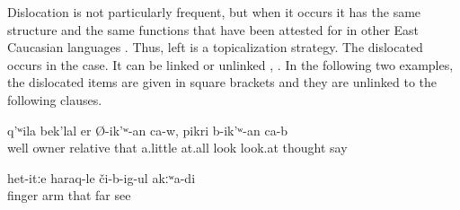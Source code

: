 Dislocation is not particularly frequent, but when it occurs it has the same structure and the same functions that have been attested for  in other East Caucasian languages \citep{Forker.Belyaev2016}. Thus, left  is a topicalization strategy. The dislocated  occurs in the  case. It can be linked or unlinked , . In the following two examples, the dislocated items are given in square brackets and they are unlinked to the following clauses.
%
\begin{exe}
	\ex	\label{ex:Well, also those own relatives, and those who do not have (relatives), one has to look after them a bit, think of them}
	\gll	[nu	ix-tːi	w-ah-la	tuχum-te=ra		il-tːi	akːʷ-ar-te=ra]	q'ʷila	bek'lal	er	Ø-ik'ʷ-an	ca-w,	pikri	b-ik'ʷ-an	ca-b\\
		well		owner	relative		that		a.little	at.all	look	look.at\tsc{.ipfv-ptcp} 		thought	say	\\
	\glt	{}

	\ex	\label{ex:‎The fingers, the hands, I do not see that far}
	\gll	[t'upː-e=ra	nuˁq-be=ra=q'al]	het-itːe	haraq-le	či-b-ig-ul	akːʷa-di\\
		finger	arm	that\tsc{-advz}	far	see	\\
	\glt	{}
\end{exe}

